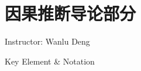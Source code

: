\section{因果推断导论部分}\label{SecCausalInference}
\begin{center}
    Instructor: Wanlu Deng
\end{center}






\begin{point}
    Key Element \& Notation
\end{point}

